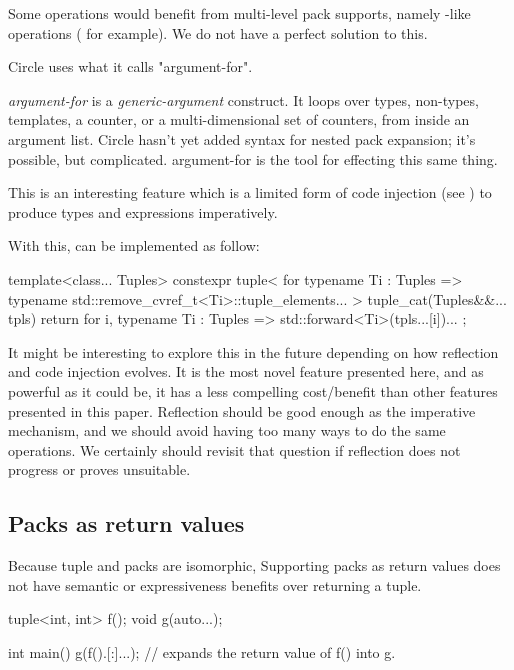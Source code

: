 \documentclass{wg21}
\begin{document}
Some operations would benefit from multi-level pack supports, namely -like operations ( for example).
We do not have a perfect solution to this.

Circle uses what it calls "argument-for".

\begin{quoteblock}
\emph{argument-for} is a  \emph{generic-argument} construct. It loops over types, non-types, templates, a counter, or a multi-dimensional set of counters, from inside an argument list. Circle hasn't yet added syntax for nested pack expansion; it's possible, but complicated. argument-for is the tool for effecting this same thing.
\end{quoteblock}

This is an interesting feature which is a limited form of code injection (see ) to produce types and expressions imperatively.

With this,  can be implemented as follow:

\begin{colorblock}
    template<class... Tuples>
    constexpr tuple<
    for typename Ti : Tuples =>
        typename std::remove_cvref_t<Ti>::tuple_elements...
    >
    tuple_cat(Tuples&&... tpls) {
        return {
            for i, typename Ti : Tuples => std::forward<Ti>(tpls...[i])...
        };
    }
\end{colorblock}

It might be interesting to explore this in the future depending on how reflection and code injection evolves.
It is the most novel feature presented here, and as powerful as it could be, it has a less compelling cost/benefit than other features presented in this paper.
Reflection should be good enough as the imperative mechanism, and we should avoid having too many ways to do the same operations.
We certainly should revisit that question if reflection does not progress or proves unsuitable.

\subsection{Packs as return values}
\label{sec:packasreturn}

Because tuple and packs are isomorphic, Supporting packs as return values does not have semantic or expressiveness benefits over returning a tuple.

\begin{colorblock}
tuple<int, int> f();
void g(auto...);

int main() {
    g(f().[:]...); // expands the return value of f() into g.
}
\end{colorblock}
\end{document}
